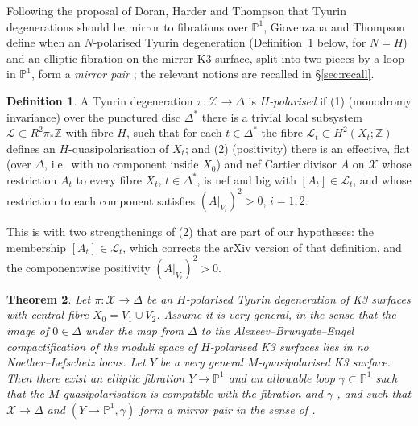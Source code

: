\documentclass[11pt]{article}
\newcommand{\Z}{\mathbb Z}
\newcommand{\PP}{\mathbb P}
\newcommand{\calX}{\mathcal X}
\newcommand{\calL}{\mathcal L}
\newtheorem{theorem}{Theorem}[section]
\theoremstyle{definition}
\newtheorem{definition}[theorem]{Definition}
\theoremstyle{remark}
\begin{document}
Following the proposal of Doran, Harder and Thompson \cite{DHT} that
Tyurin degenerations should be mirror to fibrations over \(\PP^1\),
Giovenzana and Thompson \cite{GT} define when an \(N\)-polarised
Tyurin degeneration (Definition~\ref{def:Hpol} below, for \(N=H\)) and
an elliptic fibration on the mirror K3 surface, split into two pieces
by a loop in \(\PP^1\), form a \emph{mirror pair}
\cite[Definition~5.1]{GT}; the relevant notions are recalled in
\S\ref{sec:recall}.

\begin{definition}\label{def:Hpol}
A Tyurin degeneration \(\pi\colon\calX\to\Delta\) is
\emph{\(H\)-polarised} if
(1) (monodromy invariance) over the punctured disc \(\Delta^*\)
there is a trivial local subsystem \(\calL\subset R^2\pi_*\Z\) with
fibre \(H\), such that for each \(t\in\Delta^*\) the fibre
\(\calL_t\subset H^2(X_t;\Z)\) defines an \(H\)-quasipolarisation of
\(X_t\); and
(2) (positivity) there is an effective, flat (over \(\Delta\), i.e.\
with no component inside \(X_0\)) and nef Cartier divisor
\(A\) on \(\calX\) whose restriction \(A_t\) to every fibre \(X_t\),
\(t\in\Delta^*\), is nef and big with \([A_t]\in\calL_t\), and whose
restriction to each component satisfies \((A|_{V_i})^2>0\),
\(i=1,2\).
\end{definition}

This is \cite[Definition~3.20]{GT} with two strengthenings of (2)
that are part of our hypotheses: the membership \([A_t]\in\calL_t\),
which corrects the arXiv version of that definition, and the
componentwise positivity \((A|_{V_i})^2>0\).

\begin{theorem}\label{thm:main}
Let \(\pi\colon\calX\to\Delta\) be an \(H\)-polarised Tyurin
degeneration of K3 surfaces with central fibre \(X_0=V_1\cup V_2\).
Assume it is very general, in the sense that the image of
\(0\in\Delta\) under the map from \(\Delta\) to the
Alexeev--Brunyate--Engel compactification \cite{ABE} of the moduli
space of \(H\)-polarised K3 surfaces lies in no Noether--Lefschetz
locus. Let \(Y\) be a very general \(M\)-quasipolarised K3 surface.
Then there exist an elliptic fibration \(Y\to\PP^1\) and an allowable
loop \(\gamma\subset\PP^1\) \cite[Definition~4.11]{GT} such that the
\(M\)-quasipolarisation is compatible with the fibration and
\(\gamma\) \cite[Definition~4.21]{GT}, and such that \(\calX\to\Delta\)
and \((Y\to\PP^1,\gamma)\) form a mirror pair in the sense of
\cite[Definition~5.1]{GT}.
\end{theorem}
\end{document}
